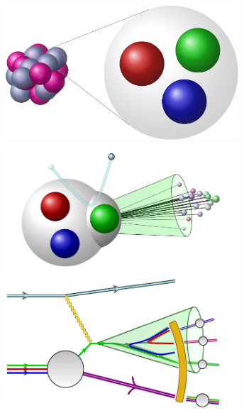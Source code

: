 \begin{sourcefigure}[t!]
    \centering
    \includegraphics[width=0.65\textwidth]{figures/picturebook/particles}
    \caption[A visualization of quarks as fundamental particles within the proton.]{
        Quarks, visualized as red, blue, and green spheres, are fundamental particles contained within the proton.
        This is only a visualization -- quarks are pointlike, as far as we know, and among the smallest known pieces of our universe.
    }
    \label{fig:picturebook_particles}
\end{sourcefigure}


\begin{sourcefigure}[t!]
    \centering
    \includegraphics[width=0.6\textwidth]{figures/picturebook/dis-1}
    \hfill
    \includegraphics[width=0.6\textwidth]{figures/picturebook/dis-2}

    \caption[A visualization of jets formed by ejecting a quark from a nucleon during high energy scattering.]{
        Jets, collimated sprays of hadronic particles visualized as green cones, are formed when quarks (or gluons) are pushed out of their confines during a high-energy particle collision and undergo a cascading series of ``decays'' called the partonic cascade.
    }

    \label{fig:picturebook_jets}
\end{sourcefigure}


